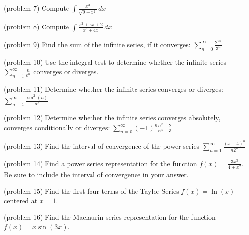 \documentclass[handout]{ximera}
\begin{document}
\begin{problem}(problem 7)
Compute $\displaystyle \int \frac{x^3}{ \sqrt{9+x^2}} \, dx$

\end{problem}



\begin{problem}(problem 8)
Compute $\displaystyle \int \frac{x^2 + 5x + 2}{x^3 + 4x} \, dx$

\end{problem}






\begin{problem}(problem 9)
Find the sum of the infinite series, if it converges: $\displaystyle \sum_{n=0}^\infty \frac{2^{2n}}{3^n}$

\end{problem}


\begin{problem}(problem 10)
Use the integral test to determine whether the infinite series $\displaystyle \sum_{n=1}^\infty \frac{n}{e^n}$
converges or diverges.

\end{problem}


\begin{problem}(problem 11)
Determine whether the infinite series converges or diverges: $\displaystyle \sum_{n=1}^\infty \frac{\sin^2(n)}{n^3}$

\end{problem}


\begin{problem}(problem 12)
Determine whether the infinite series converges absolutely, converges conditionally or diverges: $\displaystyle \sum_{n=0}^\infty (-1)^n \frac{n^2 + 2}{n^3 + 3}$


\end{problem}


\begin{problem}(problem 13)
Find the interval of convergence of the power series $\displaystyle \sum_{n=1}^\infty \frac{(x-4)^n}{n2^n}$

\end{problem}


\begin{problem}(problem 14)
Find a power series representation for the function $\displaystyle f(x) = \frac{3x^3}{4 + x^2}$.
Be sure to include the interval of convergence in your answer.

\end{problem}



\begin{problem}(problem 15)
Find the first four terms of the Taylor Series $f(x) = \ln(x)$ centered at $x = 1$.

\end{problem}



\begin{problem}(problem 16)
Find the Maclaurin series representation for the function $f(x) = x\sin(3x)$.

\end{problem}
\end{document}
